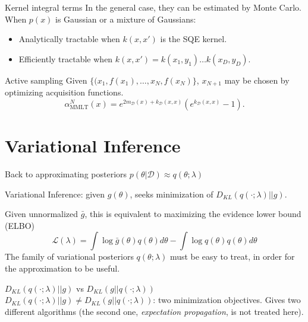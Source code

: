 \documentclass{beamer}
\def \gu {{\bar{g}}}
\begin{document}
\begin{frame}{}
\begin{block}{Kernel integral terms}
In the general case, they can be estimated by Monte Carlo.
When $p(x)$ is Gaussian or a mixture of Gaussians:
\begin{itemize}
\item Analytically tractable when $k(x,x')$ is the SQE kernel.
\item Efficiently tractable when $k(x,x') = k(x_1,y_1) \ldots k(x_D,y_D)$.
\end{itemize}
\begin{block}{Active sampling}
Given $\{(x_1,f(x_1),\ldots,x_N,f(x_N)\}$, $x_{N+1}$ may be chosen by optimizing acquisition functions.
\begin{equation*}
\alpha^N_{\text{MMLT}}(x) = e^{2 m_\mathcal{D}(x) + k_\mathcal{D}(x,x)} \left(e^{k_\mathcal{D}(x,x)}-1\right).
\end{equation*}
\end{block}
\end{block}
\end{frame}

\section{Variational Inference}
\begin{frame}{}
\begin{block}{Back to approximating posteriors $p(\theta|\mathcal{D}) \approx q(\theta;\lambda)$}

Variational Inference: given $g(\theta)$, seeks minimization of $D_{KL}(q(\cdot;\lambda)||g)$.

Given unnormalized $\gu$, this is equivalent to maximizing the evidence lower bound (ELBO) 
\begin{equation*}
\mathcal{L}(\lambda) = 
\int \log \gu(\theta) q(\theta) d\theta - \int \log q(\theta) q(\theta) d\theta
\end{equation*}
The family of variational posteriors $q(\theta;\lambda)$ must be easy to treat, in order for the approximation to be useful.


\end{block}
\begin{block}{$D_{KL}(q(\cdot;\lambda)||g)$ vs $D_{KL}(g||q(\cdot;\lambda))$}
$D_{KL}(q(\cdot;\lambda)||g) \neq D_{KL}(g||q(\cdot;\lambda))$: two minimization objectives. Gives two different algorithms (the second one, \textit{expectation propagation}, is not treated here).

\end{block}
\end{frame}
\end{document}
